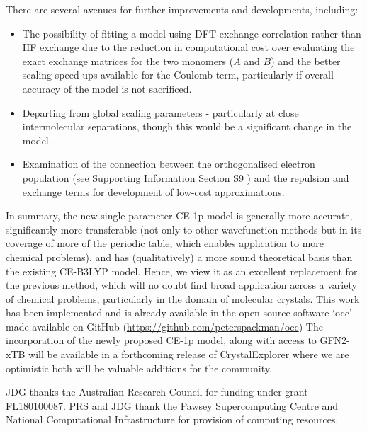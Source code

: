 \documentclass[preprint]{iucr}              %
\begin{document}
There are several avenues for further improvements and developments, including: 
\begin{itemize}
    \item The possibility of fitting a model using DFT exchange-correlation rather than HF exchange due to the reduction in computational cost over evaluating the exact exchange matrices for the two monomers ($A$ and $B$) and the better scaling speed-ups available for the Coulomb term, particularly if overall accuracy of the model is not sacrificed.
    \item Departing from global scaling parameters - particularly at close intermolecular separations, though this would be a significant change in the model.
    \item Examination of the connection between the orthogonalised electron population (see Supporting Information Section S9 %
    ) and the repulsion and exchange terms for development of low-cost approximations.
\end{itemize}

In summary, the new single-parameter CE-1p model is generally more accurate, significantly more transferable (not only to other wavefunction methods but in its coverage of more of the periodic table, which enables application to more chemical problems), and has (qualitatively) a more sound theoretical basis than the existing CE-B3LYP model. Hence, we view it as an excellent replacement for the previous method, which will no doubt find broad application across a variety of chemical problems, particularly in the domain of molecular crystals. This work has been implemented and is already available in the open source software `occ' made available on GitHub 
(\url{https://github.com/peterspackman/occ})
The incorporation of the newly proposed CE-1p model, along with access to GFN2-xTB will be available in a forthcoming release of CrystalExplorer where we are optimistic both will be valuable additions for the community. 





JDG thanks the Australian Research Council for funding under grant FL180100087. PRS and JDG thank the Pawsey Supercomputing Centre and National Computational Infrastructure for provision of computing resources. 


\end{document}
